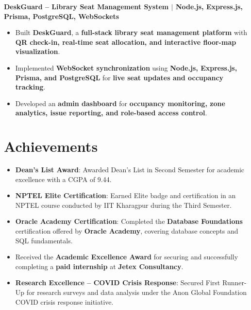 \documentclass[9pt]{extarticle}
\newcommand{\project}[2]{
  \textbf{#1} \hfill \textit{#2}
}
\newcommand{\achievement}[2]{
  \textbf{#1}: #2
}
\newenvironment{tightitemize}{
  \begin{itemize}[leftmargin=0.14in, itemsep=0pt, topsep=1pt, parsep=0pt, partopsep=0pt]
}{
  \end{itemize}
}
\begin{document}
\project{DeskGuard -- Library Seat Management System $|$ Node.js, Express.js, Prisma, PostgreSQL, WebSockets}{}
\begin{tightitemize}
  \item Built \textbf{DeskGuard}, a \textbf{full-stack library seat management platform} with \textbf{QR check-in, real-time seat allocation, and interactive floor-map visualization}.
  \item Implemented \textbf{WebSocket synchronization} using \textbf{Node.js, Express.js, Prisma, and PostgreSQL} for \textbf{live seat updates and occupancy tracking}.
  \item Developed an \textbf{admin dashboard} for \textbf{occupancy monitoring, zone analytics, issue reporting, and role-based access control}.
\end{tightitemize}
\vspace{-5pt}

\section{Achievements}
\begin{tightitemize}
  \item \achievement{Dean's List Award}{Awarded Dean's List in Second Semester for academic excellence with a CGPA of 9.44.}
  \item \achievement{NPTEL Elite Certification}{Earned Elite badge and certification in an NPTEL course conducted by IIT Kharagpur during the Third Semester.}
  \item \achievement{Oracle Academy Certification}{Completed the \textbf{Database Foundations} certification offered by \textbf{Oracle Academy}, covering database concepts and SQL fundamentals.}
  \item Received the \textbf{Academic Excellence Award} for securing and successfully completing a \textbf{paid internship} at \textbf{Jetex Consultancy}.
  \item \achievement{Research Excellence -- COVID Crisis Response}{Secured First Runner-Up for research surveys and data analysis under the Anon Global Foundation COVID crisis response initiative.}
\end{tightitemize}
\end{document}
